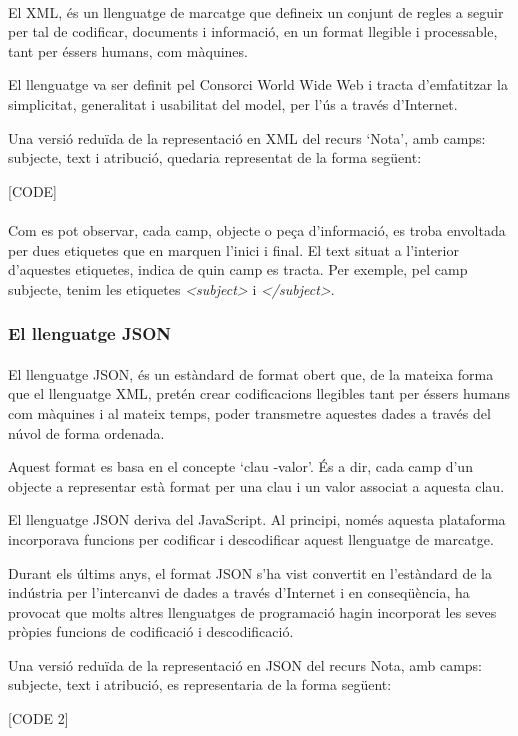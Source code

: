         \paragraph{}
        El \gls{XML}, és un llenguatge de marcatge que defineix un conjunt de regles a seguir per tal de codificar, documents i informació, en un format llegible i processable, tant per éssers humans, com màquines.

        El llenguatge va ser definit pel Consorci World Wide Web i tracta d’emfatitzar la simplicitat, generalitat i usabilitat del model, per l'ús a través d'Internet.

        Una versió reduïda de la representació en XML del recurs ‘Nota’, amb camps: subjecte, text i atribució, quedaria representat de la forma següent:

        [CODE]

        \paragraph{}
        Com es pot observar, cada camp, objecte o peça d'informació, es troba envoltada per dues etiquetes que en marquen l'inici i final. El text situat a l'interior d'aquestes etiquetes, indica de quin camp es tracta. Per exemple, pel camp subjecte, tenim les etiquetes \emph{<subject>} i \emph{</subject>}.


        \subsubsection{El llenguatge JSON}

        \paragraph{}
        El llenguatge \gls{JSON}, és un estàndard de format obert que, de la mateixa forma que el llenguatge XML, pretén crear codificacions llegibles tant per éssers humans com màquines i al mateix temps, poder transmetre aquestes dades a través del núvol de forma ordenada.

        Aquest format es basa en el concepte ‘clau -valor’. És a dir, cada camp d'un objecte a representar està format per una clau i un valor associat a aquesta clau.

        El llenguatge JSON deriva del JavaScript. Al principi, només aquesta plataforma incorporava funcions per codificar i descodificar aquest llenguatge de marcatge.

        Durant els últims anys, el format JSON s'ha vist convertit en l'estàndard de la indústria per l'intercanvi de dades a través d'Internet i en conseqüència, ha provocat que molts altres llenguatges de programació hagin incorporat les seves pròpies funcions de codificació i descodificació.

        Una versió reduïda de la representació en JSON del recurs Nota, amb camps: subjecte, text i atribució, es representaria de la forma següent:

        [CODE 2]
